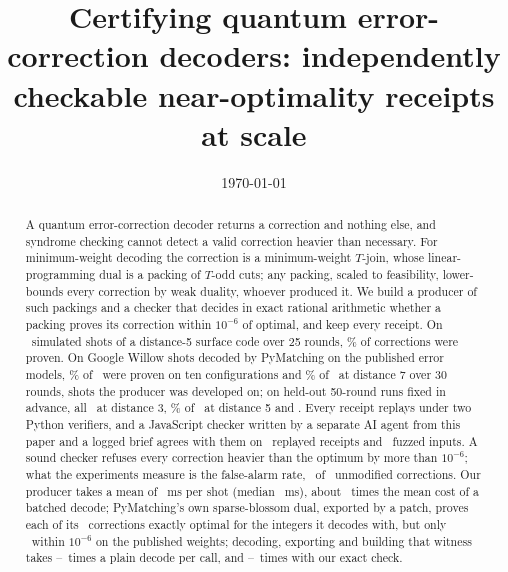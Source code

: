 \documentclass[aps,pra,twocolumn,superscriptaddress,nofootinbib,longbibliography,floatfix]{revtex4-2}
\begin{document}
\title{Certifying quantum error-correction decoders: independently checkable near-optimality receipts at scale}

\OwnerAuthor
\OwnerAffiliation

\date{\today}

\begin{abstract}
A quantum error-correction decoder returns a correction and nothing else, and syndrome checking cannot detect a valid correction heavier than necessary. For minimum-weight decoding the correction is a minimum-weight $T$-join, whose linear-programming dual is a packing of $T$-odd cuts; any packing, scaled to feasibility, lower-bounds every correction by weak duality, whoever produced it. We build a producer of such packings and a checker that decides in exact rational arithmetic whether a packing proves its correction within $10^{-6}$ of optimal, and keep every receipt. On \EpsSimShots\ simulated shots of a distance-5 surface code over 25 rounds, \EpsSimAcceptedPct\% of corrections were proven. On Google Willow shots decoded by PyMatching on the published error models, \EpsHwGenFourPct\% of \EpsHwGenFourNontrivial\ were proven on ten configurations and \EpsHwGenSixPct\% of \EpsHwGenSixNontrivial\ at distance 7 over 30 rounds, shots the producer was developed on; on held-out 50-round runs fixed in advance, all \HoWDThreeN\ at distance 3, \HoWDFivePct\% of \HoWDFiveN\ at distance 5 and \HoDSevenAbstract. Every receipt replays under two Python verifiers, and a JavaScript checker written by a separate AI agent from this paper and a logged brief agrees with them on \JsReplayReceipts\ replayed receipts and \FuzzCases\ fuzzed inputs. A sound checker refuses every correction heavier than the optimum by more than $10^{-6}$; what the experiments measure is the false-alarm rate, \DetCleanFalseAlarms\ of \DetCleanN\ unmodified corrections. Our producer takes a mean of \CertifyMsMean~ms per shot (median \CertifyMsMedian~ms), about \CostRatioBatch\ times the mean cost of a batched decode; PyMatching's own sparse-blossom dual, exported by a patch, proves each of its \NdIntShots\ corrections exactly optimal for the integers it decodes with, but only \NdRawProvenTotal\ within $10^{-6}$ on the published weights; decoding, exporting and building that witness takes \NdCallRatioLo--\NdCallRatioHi\ times a plain decode per call, and \NdCompleteRatioLo--\NdCompleteRatioHi\ times with our exact check.
\end{abstract}

\maketitle
\end{document}
